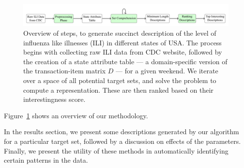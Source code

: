 \begin{figure}
\centering
\includegraphics[width=0.95\linewidth]{./figures/epi-summary-pipeline/main.pdf}
\caption{Overview of steps, to generate succinct description of the level of
influenza like illnesses (ILI) in different states of USA.
The process begins with collecting raw ILI data from CDC website,
followed by the creation of a state attribute table ---
a domain-specific version of the transaction-item matrix $D$ --- for a given weekend.
We iterate over a space of all potential target sets, and solve the
\minapproxdesc{} problem to compute a representation. These are then ranked based
on their interestingness score.
}
\label{fig:epi-summary-pipeline}
\end{figure}

Figure~\ref{fig:epi-summary-pipeline} shows an overview of our methodology. 

In the results section, we present some descriptions generated by our algorithm for a particular target set, followed by a discussion on effects of the parameters. Finally, we present the utility of these methods in automatically identifying certain patterns in the data. 
